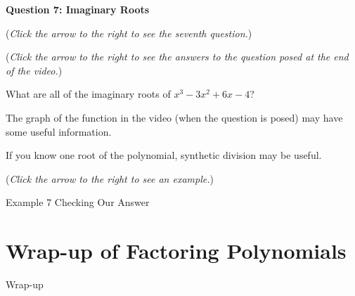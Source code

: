 \documentclass{ximera}
\begin{document}
\textbf{Question 7: Imaginary Roots}
\begin{question}
\begin{flushright}
{\color{blue}(\emph{Click the arrow to the right to see the seventh question.})}
\end{flushright}
\begin{center}
\begin{expandable}
{\color{blue}(\emph{Click the arrow to the right to see the answers 
to the question posed at the end of the video.})}
\begin{expandable}
What are all of the imaginary roots of $x^3 - 3x^2 + 6x - 4$?
\begin{multipleChoice}
\end{multipleChoice}
\begin{hint}
The graph of the function in the video (when the question is posed)
may have some useful information.
\end{hint}
\begin{hint}
If you know one root of the polynomial, synthetic division may be useful.
\end{hint}
\begin{flushright}
{\color{blue}(\emph{Click the arrow to the right to see an example.})}
\end{flushright}
\begin{expandable}
Example 7
Checking Our Answer %
\end{expandable}
\end{expandable}
\end{expandable}
\end{center}
\end{question}


\section{Wrap-up of Factoring Polynomials}

\begin{expandable}
Wrap-up
\end{expandable}
\end{document}
